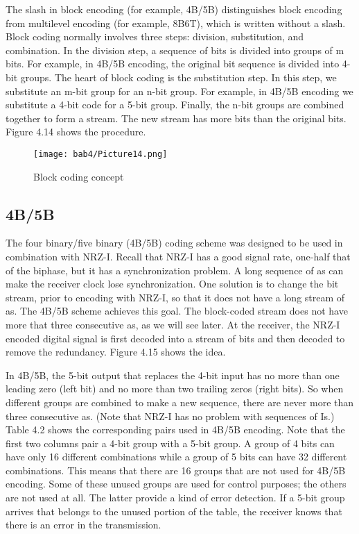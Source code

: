 The slash in block encoding (for example, 4B/5B) distinguishes block encoding from multilevel encoding (for example, 8B6T), which is written without a slash. Block coding normally involves three steps: division, substitution, and combination. In the division step, a sequence of bits is divided into groups of m bits. For example, in 4B/5B encoding, the original bit sequence is divided into 4-bit groups. The heart of block coding is the substitution step. In this step, we substitute an m-bit group for an n-bit group. For example, in 4B/5B encoding we substitute a 4-bit code for a 5-bit group. Finally, the n-bit groups are combined together to form a stream. The new stream has more bits than the original bits. Figure 4.14 shows the procedure.

\begin{figure}
  \centering
  \texttt{[image: bab4/Picture14.png]}
  \caption{Block coding concept}
  \label{fig4:14}
\end{figure}

\subsection*{4B/5B} 
The four binary/five binary (4B/5B) coding scheme was designed to be used in combination with NRZ-I. Recall that NRZ-I has a good signal rate, one-half that of the biphase, but it has a synchronization problem. A long sequence of as can make the receiver clock lose synchronization. One solution is to change the bit stream, prior to encoding with NRZ-I, so that it does not have a long stream of as. The 4B/5B scheme achieves this goal. The block-coded stream does not have more that three consecutive as, as we will see later. At the receiver, the NRZ-I encoded digital signal is first decoded into a stream of bits and then decoded to remove the redundancy. Figure 4.15 shows the idea.

In 4B/5B, the 5-bit output that replaces the 4-bit input has no more than one leading zero (left bit) and no more than two trailing zeros (right bits). So when different groups are combined to make a new sequence, there are never more than three consecutive as. (Note that NRZ-I has no problem with sequences of Is.) Table 4.2 shows the corresponding pairs used in 4B/5B encoding. Note that the first two columns pair a 4-bit group with a 5-bit group. A group of 4 bits can have only 16 different combinations while a group of 5 bits can have 32 different combinations. This means that there are 16 groups that are not used for 4B/5B encoding. Some of these unused groups are used for control purposes; the others are not used at all. The latter provide a kind of error detection. If a 5-bit group arrives that belongs to the unused portion of the table, the receiver knows that there is an error in the transmission.

